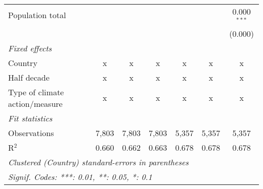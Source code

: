 \begin{tabular}{lcccccc}
   Population total                                                     &         &                &                &                &                & 0.000$^{***}$\\   
                                                                        &         &                &                &                &                & (0.000)\\   
   \emph{Fixed effects}\\
   Country                                                              & x       & x              & x              & x              & x              & x\\  
   Half decade                                                          & x       & x              & x              & x              & x              & x\\  
   Type of climate action/measure                                       & x       & x              & x              & x              & x              & x\\  
   \midrule \emph{Fit statistics}\\
   Observations                                                         & 7,803   & 7,803          & 7,803          & 5,357          & 5,357          & 5,357\\  
   R$^2$                                                                & 0.660   & 0.662          & 0.663          & 0.678          & 0.678          & 0.678\\  
   \midrule
   \multicolumn{7}{l}{\emph{Clustered (Country) standard-errors in parentheses}}\\
   \multicolumn{7}{l}{\emph{Signif. Codes: ***: 0.01, **: 0.05, *: 0.1}}\\
\end{tabular}
\par\endgroup


